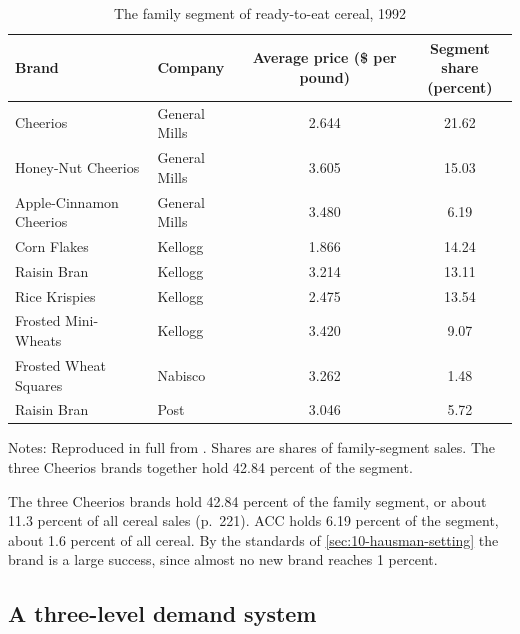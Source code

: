 \begin{table}[htbp]
\centering
\caption{The family segment of ready-to-eat cereal, 1992}\label{tab:10-hausman-desc}
\begin{threeparttable}
\begin{tabular}{@{}llcc@{}}
\toprule
Brand & Company & \makecell{Average price\\(\$ per pound)} & \makecell{Segment share\\(percent)} \\
\midrule
Cheerios                & General Mills & 2.644 & 21.62 \\
Honey-Nut Cheerios      & General Mills & 3.605 & 15.03 \\
Apple-Cinnamon Cheerios & General Mills & 3.480 & \phantom{0}6.19 \\
Corn Flakes             & Kellogg       & 1.866 & 14.24 \\
Raisin Bran             & Kellogg       & 3.214 & 13.11 \\
Rice Krispies           & Kellogg       & 2.475 & 13.54 \\
Frosted Mini-Wheats     & Kellogg       & 3.420 & \phantom{0}9.07 \\
Frosted Wheat Squares   & Nabisco       & 3.262 & \phantom{0}1.48 \\
Raisin Bran             & Post          & 3.046 & \phantom{0}5.72 \\
\bottomrule
\end{tabular}
\begin{tablenotes}[flushleft]\footnotesize
\item Notes: Reproduced in full from \citet[Table 5.2]{Hausman1997}. Shares are shares of family-segment
sales. The three Cheerios brands together hold 42.84 percent of the segment.
\end{tablenotes}
\end{threeparttable}
\end{table}

The three Cheerios brands hold 42.84 percent of the family segment, or about 11.3 percent of all cereal
sales (p.~221). ACC holds 6.19 percent of the segment, about 1.6 percent of all cereal. By the standards of
\cref{sec:10-hausman-setting} the brand is a large success, since almost no new brand reaches 1 percent.

\subsection{A three-level demand system}\label{sec:10-hausman-model}

